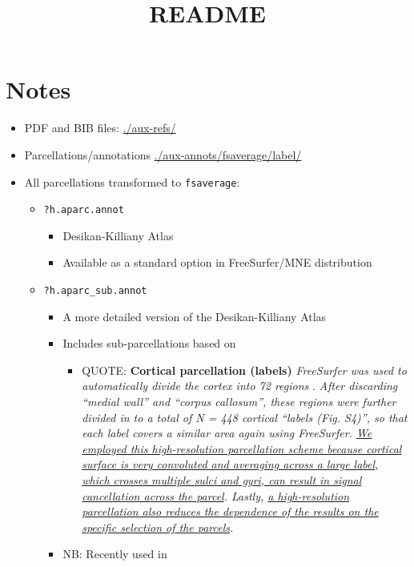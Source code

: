 \documentclass[a4paper,10pt,onecolumn,oneside,openright]{article}
\date{}
\title{README}
\begin{document}
\maketitle
\section{Notes}
\label{sec:orgde15448}
\begin{itemize}
\item PDF and BIB files: \url{./aux-refs/}
\item Parcellations/annotations \url{./aux-annots/fsaverage/label/}
\item All parcellations transformed to \texttt{fsaverage}:
\begin{itemize}
\item \texttt{?h.aparc.annot}
\begin{itemize}
\item Desikan-Killiany Atlas \parencite{r2006PaperDesikanEtAlN2}
\item Available as a standard option in FreeSurfer/MNE distribution
\end{itemize}
\item \texttt{?h.aparc\_sub.annot}
\begin{itemize}
\item A more detailed version of the Desikan-Killiany Atlas
\parencite{r2006PaperDesikanEtAlN2}
\item Includes sub-parcellations based on
\textcite{r2018PaperKhanEtAlN2}
\begin{itemize}
\item QUOTE: \textbf{Cortical parcellation (labels)} \emph{FreeSurfer was
used to automatically divide the cortex into 72 regions}
\parencite{r1999PaperDaleEtAlN2}. \emph{After discarding “medial
wall” and “corpus callosum”, these regions were further
divided in to a total of N = 448 cortical “labels (Fig.
S4)”, so that each label covers a similar area again using
FreeSurfer. \uline{We employed this high-resolution parcellation
scheme because cortical surface is very convoluted and
averaging across a large label, which crosses multiple
sulci and gyri, can result in signal cancellation across
the parcel}. Lastly, \uline{a high-resolution parcellation also
reduces the dependence of the results on the specific
selection of the parcels}.}
\end{itemize}
\item NB: Recently used in \textcite{r2025PaperRuuskanenAvendano-DiazN1}
\begin{itemize}

\end{itemize}
\end{itemize}
\end{itemize}
\end{itemize}
\end{document}
